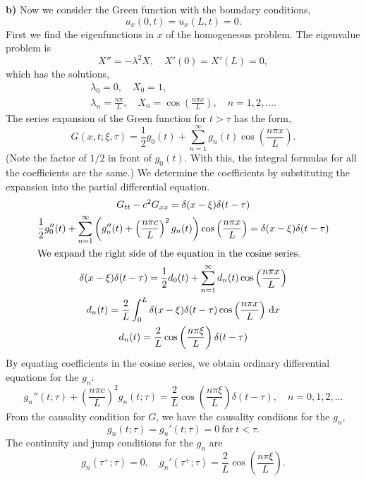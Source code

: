 {\begin{Solution}
  \textbf{b)}
  Now we consider the Green function with the boundary conditions,
  \[
  u_x(0,t) = u_x(L, t) = 0.
  \]
  First we find the eigenfunctions in $x$ of the homogeneous problem.  The
  eigenvalue problem is
  \[
  X'' = - \lambda^2 X, \quad X'(0) = X'(L) = 0,
  \]
  which has the solutions,
  \begin{gather*}
    \lambda_0 = 0, \quad X_0 = 1, \\
    \lambda_n = \frac{n \pi}{L}, \quad X_n = \cos \left( \frac{n \pi x}{L} \right),
    \quad n = 1,2,\ldots.
  \end{gather*}
  The series expansion of the Green function for $t > \tau$ has the form,
  \[
  G(x, t; \xi, \tau) = \frac{1}{2} g_0(t) + \sum_{n = 1}^\infty g_n(t)
  \cos \left( \frac{n \pi x}{L} \right).
  \]
  (Note the factor of $1/2$ in front of $g_0(t)$.  With this, the integral 
  formulas for all the coefficients are the same.)  We determine the coefficients
  by substituting the expansion into the partial differential equation.
  \begin{gather*}
    G_{t t} - c^2 G_{x x} = \delta(x - \xi) \delta(t - \tau) \\
    \frac{1}{2} g_0''(t) + \sum_{n = 1}^\infty \left( g_n''(t) 
      + \left( \frac{n \pi c}{L} \right)^2 g_n(t) \right)
    \cos \left( \frac{n \pi x}{L} \right) 
    = \delta(x - \xi) \delta(t - \tau) \\
    \intertext{We expand the right side of the equation in the cosine series.}
    \delta(x - \xi) \delta(t - \tau) = \frac{1}{2} d_0(t) + \sum_{n = 1}^\infty
    d_n(t) \cos \left( \frac{n \pi x}{L} \right) \\
    d_n(t) = \frac{2}{L} \int_0^L \delta(x - \xi) \delta(t - \tau)
    \cos \left( \frac{n \pi x}{L} \right) \,\mathrm{d} x \\
    d_n(t) = \frac{2}{L} \cos \left( \frac{n \pi \xi}{L} \right) \delta(t - \tau)
  \end{gather*}
  By equating coefficients in the cosine series, we obtain ordinary differential
  equations for the $g_n$.
  \[
  g_n''(t; \tau) + \left( \frac{n \pi c}{L} \right)^2 g_n(t; \tau)
  = \frac{2}{L} \cos \left( \frac{n \pi \xi}{L} \right) \delta(t - \tau),
  \quad n = 0,1,2,\ldots
  \]
  From the causality condition for $G$, we have the causality condiions
  for the $g_n$,
  \[
  g_n(t; \tau) = g_n'(t;\tau) = 0\ \mathrm{for}\ t < \tau.
  \]
  The continuity and jump conditions for the $g_n$ are
  \[
  g_n(\tau^+; \tau) = 0, \quad
  g_n'(\tau^+; \tau) = \frac{2}{L} \cos \left( \frac{n \pi \xi}{L} \right).
  \]

\end{Solution}}
